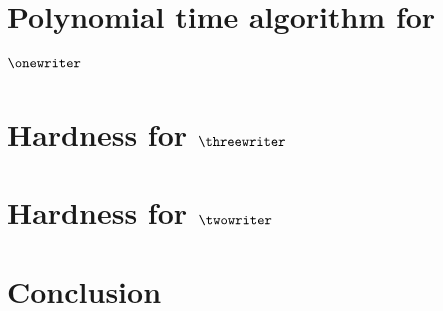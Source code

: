 \section{Polynomial time algorithm for $\onewriter$}

\section{Hardness for $\threewriter$}

\section{Hardness for $\twowriter$}

\section{Conclusion}


 

